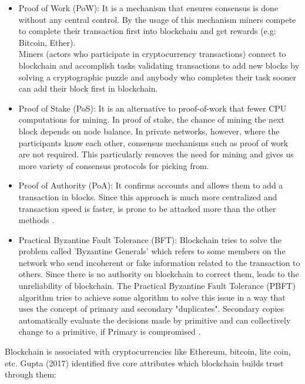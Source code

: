 \begin{itemize}
    \item Proof of Work (PoW): 
    It is a mechanism that ensures consensus is done without any central control. By the usage of this mechanism miners compete to complete their transaction first into blockchain and get rewards (e.g: Bitcoin, Ether).\\
    Miners (actors who participate in cryptocurrency transactions) connect to blockchain and accomplish tasks validating transactions to add new blocks by solving a cryptographic puzzle and anybody who completes their task sooner can add their block first in blockchain\cite{Pablo}.
    \item Proof of Stake (PoS): 
    It is an alternative to proof-of-work that fewer CPU computations for mining. In proof of stake, the chance of mining the next block depends on node balance. 
    In private networks, however, where the participants know each other, consensus mechanisms such as proof of work are not required. This particularly removes the need for mining and gives us more variety of consensus protocols for picking from\cite{Christidis}.
    \item Proof of Authority (PoA): It confirms accounts and allows them to add a transaction in blocks. Since this approach is much more centralized and transaction speed is faster, is prone to be attacked more than the other methods \cite{Luke}.
    \item Practical Byzantine Fault Tolerance (BFT): Blockchain tries to solve the problem called 'Byzantine Generals' which refers to some members on the network who send incoherent or fake information related to the transaction to others. Since there is no authority on blockchain to correct them, leads to the unreliability of blockchain. The Practical Byzantine Fault Tolerance (PBFT) algorithm tries to achieve some algorithm to solve this issue in a way that uses the concept of primary and secondary "duplicates". Secondary copies automatically evaluate the decisions made by primitive and can collectively change to a primitive, if Primary is compromised \cite{Luke}.
\end{itemize}
Blockchain is associated with cryptocurrencies like Ethereum, bitcoin, lite coin, etc. Gupta (2017) \cite{Gupta} identified five core attributes which blockchain builds trust through them:
